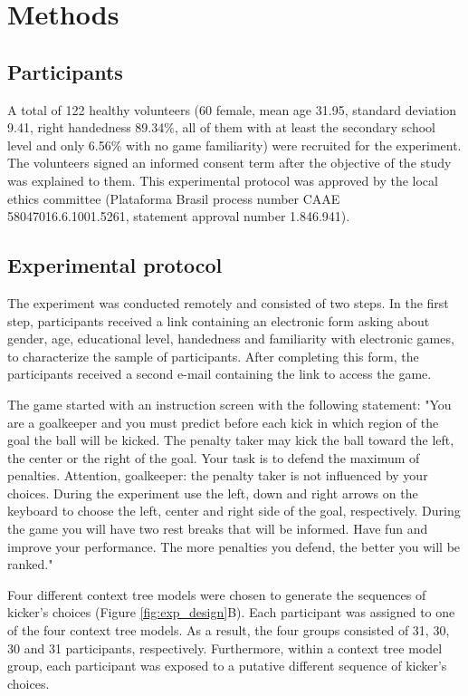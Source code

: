 \documentclass[fleqn,10pt]{wlscirep}
\begin{document}
\section*{Methods}

\subsection*{Participants}	

A total of 122 healthy volunteers (60 female, mean age 31.95, standard deviation 9.41, right handedness 89.34\%, all of them with at least the secondary school level and only 6.56\% with no game familiarity) were recruited for the experiment. The volunteers signed an informed consent term after the objective of the study was explained to them. This experimental protocol was approved by the local ethics committee (Plataforma Brasil process number CAAE 58047016.6.1001.5261, statement approval number 1.846.941).

\subsection*{Experimental protocol}

The experiment was conducted remotely and consisted of two steps. In the first step, participants received a link containing an electronic form asking about gender, age, educational level, handedness and familiarity with electronic games, to characterize the sample of participants. After completing this form, the participants received a second e-mail containing the link to access the game. 

The game started with an instruction screen with the following statement: "You are a goalkeeper and you must predict before each kick in which region of the goal the ball will be kicked. The penalty taker may kick the ball toward the left, the center or the right of the goal. Your task is to defend the maximum of penalties. Attention, goalkeeper: the penalty taker is not influenced by your choices. During the experiment use the left, down and right arrows on the keyboard to choose the left, center and right side of the goal, respectively. During the game you will have two rest breaks that will be informed.
Have fun and improve your performance. The more penalties you defend, the better you will be ranked."

Four different context tree models were chosen to generate the sequences of kicker's choices (Figure \ref{fig:exp_design}B). Each participant was assigned to one of the four context tree models. As a result, the four groups consisted of 31, 30, 30 and 31 participants, respectively. Furthermore, within a context tree model group, each participant was exposed to a putative different sequence of kicker's choices.  
\end{document}
